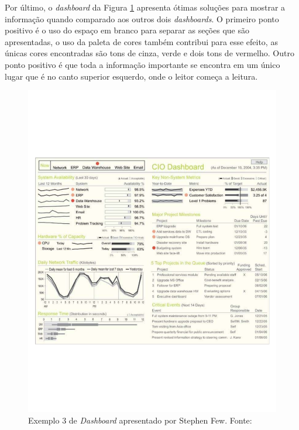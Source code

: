 Por último, o \textit{dashboard} da Figura \ref{img:dashboard3} apresenta ótimas soluções para mostrar a informação quando comparado aos outros dois \textit{dashboards}. O primeiro ponto positivo é o uso do espaço em branco para separar as seções que são apresentadas, o uso da paleta de cores também contribui para esse efeito, as únicas cores encontradas são tons de cinza, verde e dois tons de vermelho. Outro ponto positivo é que toda a informação importante se encontra em um único lugar que é no canto superior esquerdo, onde o leitor começa a leitura.
\graphicspath{{figuras/}}
\begin{figure}[]
\centering
\includegraphics[scale=0.50]{dashboard3}
\caption{Exemplo 3 de \textit{Dashboard} apresentado por Stephen Few. Fonte: \cite{book_design}}
\label{img:dashboard3}
\end{figure}

